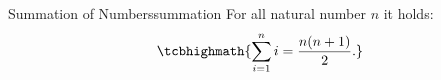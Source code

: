 \documentclass{standalone}
\begin{document}
\begin{defn*}{Summation of Numbers}{summation}
  For all natural number $n$ it holds:
  \begin{equation}
  \tcbhighmath{\sum\limits_{i=1}^n i = \frac{n(n+1)}{2}.}
  \end{equation}
\end{defn*}
\end{document}
